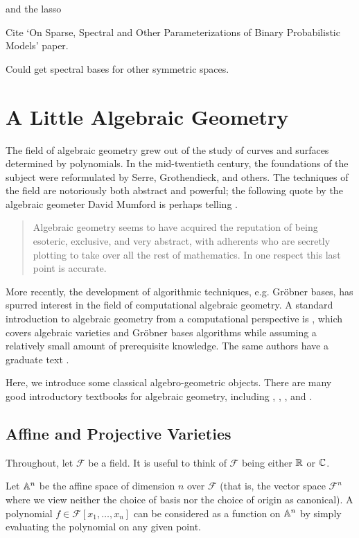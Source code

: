 \documentclass[cclicense]{hmcthesis}
\newcommand*{\F}{\mathcal{F}}
\numberwithin{equation}{chapter}
\numberwithin{thmcounter}{chapter}
\begin{document}
    and the lasso

    Cite `On Sparse, Spectral and Other Parameterizations of Binary
    Probabilistic Models' paper.

    Could get spectral bases for other symmetric spaces.




\appendix


\chapter{A Little Algebraic Geometry}

    The field of algebraic geometry grew out of the study of curves and surfaces
    determined by polynomials.  In the mid-twentieth century, the foundations of
    the subject were reformulated by Serre, Grothendieck, and others.  The
    techniques of the field are notoriously both abstract and powerful; the
    following quote by the algebraic geometer David Mumford is perhaps telling
    \citep{Mum99}.
    \begin{quote}
        Algebraic geometry seems to have acquired the reputation of being
        esoteric, exclusive, and very abstract, with adherents who are secretly
        plotting to take over all the rest of mathematics.  In one respect this
        last point is accurate.
    \end{quote}
    More recently, the development of algorithmic techniques, e.g. Gröbner
    bases, has spurred interest in the field of computational algebraic
    geometry.  A standard introduction to algebraic geometry from a
    computational perspective is \citep{CLO97}, which covers algebraic varieties
    and Gröbner bases algorithms while assuming a relatively small amount of
    prerequisite knowledge.  The same authors have a graduate text \citep{CLO05}.

    Here, we introduce some classical algebro-geometric objects.  There are
    many good introductory textbooks for algebraic geometry, including
    \citep{Invitation}, \citep{Sha94}, \citep{Hart}, and \citep{Mum99}.

\section{Affine and Projective Varieties}
    \label{sec:varieties}
    Throughout, let $\F$ be a field.  It is useful to think of $\F$ being either
    $\mathbb{R}$ or $\mathbb{C}$.

    Let $\mathbb{A}^n$ be the affine space of dimension $n$ over $\F$ (that is, the
    vector space $\F^n$ where we view neither the choice of basis nor the choice
    of origin as canonical).  A polynomial $f \in \F[x_1, \ldots, x_n]$ can be
    considered as a function on $\mathbb{A}^n$ by simply evaluating the polynomial on
    any given point.
\end{document}
